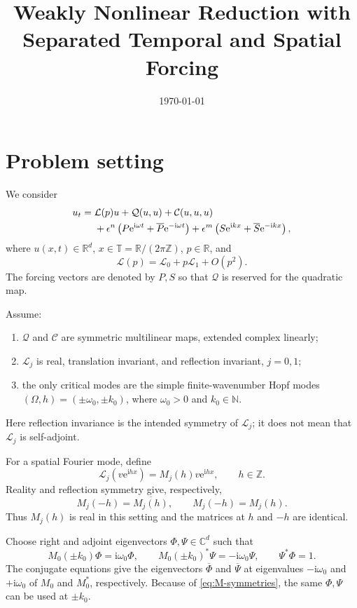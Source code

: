\documentclass[11pt]{article}
\title{Weakly Nonlinear Reduction with Separated Temporal and Spatial Forcing}
\author{}
\date{\today}
\newcommand{\ii}{\mathrm{i}}
\newcommand{\ee}{\mathrm{e}}
\newcommand{\cQ}{\mathcal{Q}}
\newcommand{\cC}{\mathcal{C}}
\newcommand{\cL}{\mathcal{L}}
\newcommand{\T}{\mathbb{T}}
\begin{document}
\maketitle

\section{Problem setting}

We consider
\begin{align}
 u_t={}&\cL(p)u+\cQ(u,u)+\cC(u,u,u) \notag\\
 &+\epsilon^n\left(P\ee^{\ii\omega t}+\overline P\ee^{-\ii\omega t}\right)
 +\epsilon^m\left(S\ee^{\ii kx}+\overline S\ee^{-\ii kx}\right),
 \label{eq:pde}
\end{align}
where $u(x,t)\in\mathbb R^d$, $x\in\T=\mathbb R/(2\pi\mathbb Z)$,
$p\in\mathbb R$, and
\begin{equation}
 \cL(p)=\cL_0+p\cL_1+O(p^2).
 \label{eq:Lexpansion}
\end{equation}
The forcing vectors are denoted by $P,S$ so that $\cQ$ is reserved for the
quadratic map.

Assume:
\begin{enumerate}
 \item $\cQ$ and $\cC$ are symmetric multilinear maps, extended complex
 linearly;
 \item $\cL_j$ is real, translation invariant, and reflection invariant,
 $j=0,1$;
 \item the only critical modes are the simple finite-wavenumber Hopf modes
 $(\Omega,h)=(\pm\omega_0,\pm k_0)$, where $\omega_0>0$ and
 $k_0\in\mathbb N$.
\end{enumerate}
Here reflection invariance is the intended symmetry of $\cL_j$; it does not
mean that $\cL_j$ is self-adjoint.

For a spatial Fourier mode, define
\begin{equation}
 \cL_j\left(v\ee^{\ii hx}\right)=M_j(h)v\ee^{\ii hx},
 \qquad h\in\mathbb Z.
 \label{eq:Fourier-symbol}
\end{equation}
Reality and reflection symmetry give, respectively,
\begin{equation}
 M_j(-h)=\overline{M_j(h)},
 \qquad M_j(-h)=M_j(h).
 \label{eq:M-symmetries}
\end{equation}
Thus $M_j(h)$ is real in this setting and the matrices at $h$ and $-h$ are
identical.

Choose right and adjoint eigenvectors $\Phi,\Psi\in\mathbb C^d$ such that
\begin{equation}
 M_0(\pm k_0)\Phi=\ii\omega_0\Phi,
 \qquad
 M_0(\pm k_0)^*\Psi=-\ii\omega_0\Psi,
 \qquad
 \Psi^*\Phi=1.
 \label{eq:eigenvectors}
\end{equation}
The conjugate equations give the eigenvectors $\overline\Phi$ and
$\overline\Psi$ at eigenvalues $-\ii\omega_0$ and $+\ii\omega_0$ of
$M_0$ and $M_0^*$, respectively.  Because of
\eqref{eq:M-symmetries}, the same $\Phi,\Psi$ can be used at $\pm k_0$.
\end{document}
